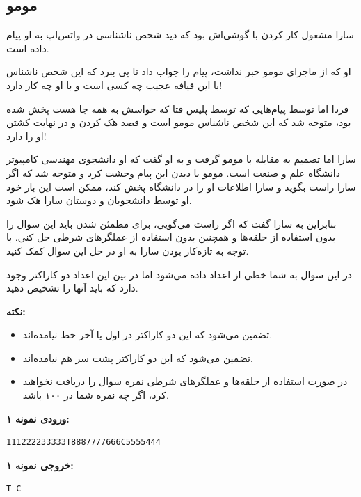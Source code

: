 \documentclass{article}
\begin{document}
\newpage

\subsection{مومو}

سارا مشغول کار کردن با گوشی‌اش بود که دید شخص ناشناسی در واتس‌اپ به او پیام داده است.

او که از ماجرای مومو خبر نداشت، پیام را جواب داد تا پی ببرد که این شخص ناشناس با این قیافه عجیب چه کسی است و با او چه کار دارد!

فردا اما توسط پیام‌هایی که توسط پلیس فتا که حواسش به همه جا هست پخش شده بود، متوجه شد که این شخص ناشناس مومو است و قصد هک کردن و در نهایت کشتن او را دارد!

سارا اما تصمیم به مقابله با مومو گرفت و به او گفت که او دانشجوی مهندسی کامپیوتر دانشگاه علم و صنعت است. مومو با دیدن این پیام وحشت کرد و متوجه شد که اگر سارا راست بگوید و سارا اطلاعات او را در دانشگاه پخش کند، ممکن است این بار خود او توسط دانشجویان و دوستان سارا هک شود.

بنابراین به سارا گفت که اگر راست می‌گویی، برای مطمئن شدن باید این سوال را بدون استفاده از حلقه‌ها و همچنین بدون استفاده از عملگرهای شرطی حل کنی. با توجه به تازه‌کار بودن سارا به او در حل این سوال کمک کنید.

در این سوال به شما خطی از اعداد داده می‌شود اما در بین این اعداد دو کاراکتر وجود دارد که باید آنها را تشخیص دهید.

\textbf{نکته:}
\begin{itemize}
    \item تضمین می‌شود که این دو کاراکتر در اول یا آخر خط نیامده‌اند.
    \item تضمین می‌شود که این دو کاراکتر پشت سر هم نیامده‌اند.
    \item در صورت استفاده از حلقه‌ها و عملگرهای شرطی نمره سوال را دریافت نخواهید کرد، اگر چه نمره شما در  ۱۰۰ باشد.
\end{itemize}

\textbf{ورودی نمونه ۱:}
\begin{LTR}
\begin{verbatim}
111222233333T8887777666C5555444
\end{verbatim}
\end{LTR}

\textbf{خروجی نمونه ۱:}
\begin{LTR}
\begin{verbatim}
T C
\end{verbatim}
\end{LTR}
\end{document}

